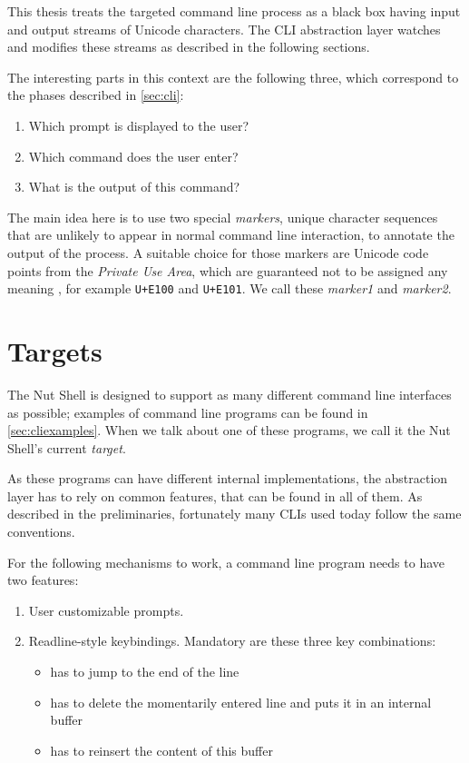 \documentclass[paper=a4,twoside,abstract=on,cleardoublepage=empty,numbers=noenddot,toc=bib,toc=listof,12pt,appendixprefix=true]{scrreprt}
\begin{document}
This thesis treats the targeted command line process as a black box having input and output streams of Unicode characters. The \textsc{CLI} abstraction layer watches and modifies these streams as described in the following sections.

The interesting parts in this context are the following three, which correspond to the phases described in \cref{sec:cli}:

\begin{enumerate}
    \item Which prompt is displayed to the user?
    \item Which command does the user enter?
    \item What is the output of this command?
\end{enumerate}

The main idea here is to use two special \emph{markers}, unique character sequences that are unlikely to appear in normal command line interaction, to annotate the output of the process. A suitable choice for those markers are Unicode code points from the \emph{Private Use Area}, which are guaranteed not to be assigned any meaning \cite[p. 558]{unicode6.2}, for example \texttt{U+E100} and \texttt{U+E101}. We call these \emph{marker1} and \emph{marker2}.

\section{Targets}
\label{sec:targets}

The Nut Shell is designed to support as many different command line interfaces as possible; examples of command line programs can be found in \cref{sec:cliexamples}. When we talk about one of these programs, we call it the Nut Shell's current \emph{target}.

As these programs can have different internal implementations, the abstraction layer has to rely on common features, that can be found in all of them. As described in the preliminaries, fortunately many \textsc{CLI}s used today follow the same conventions.

For the following mechanisms to work, a command line program needs to have two features:

\begin{enumerate}
    \item User customizable prompts.
    \item Readline-style keybindings. Mandatory are these three key combinations:
        \begin{itemize}
            \item {} has to jump to the end of the line

            \item {} has to delete the momentarily entered line and puts it in an internal buffer
            
            \item {} has to reinsert the content of this buffer
        \end{itemize}
\end{enumerate}
\end{document}
